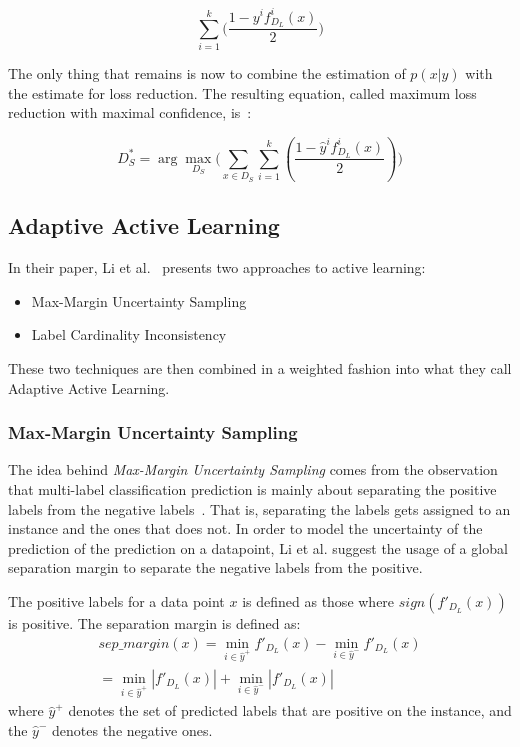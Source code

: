 \begin{equation}
    \sum_{i=1}^k\big ( \frac{1 - y^if^i_{D_L}(x)}{2} \big )
\end{equation}

The only thing that remains is now to combine the estimation of $p(x|y)$ with the estimate for loss reduction.
The resulting equation, called maximum loss reduction with maximal confidence, is~\cite{yang2009effective}:

\begin{equation}
    D^*_S = \arg \max_{D_S} \big ( \sum_{x \in D_S} \sum_{i=1}^k (\frac{1 - \hat{y}^if^i_{D_L}(x)}{2}) \big )
\end{equation}

\subsection{Adaptive Active Learning}\label{subsec:adaptive-active-learning}

In their paper, Li et al\@.~\cite{li2013active} presents two approaches to active learning:
\begin{itemize}
    \item Max-Margin Uncertainty Sampling
    \item Label Cardinality Inconsistency 
\end{itemize}
These two techniques are then combined in a weighted fashion into what they call Adaptive Active Learning.

\subsubsection{Max-Margin Uncertainty Sampling}

The idea behind \textit{Max-Margin Uncertainty Sampling} comes from the observation that multi-label classification prediction is mainly about separating the positive labels from the negative labels~\cite{li2013active}.
That is, separating the labels gets assigned to an instance and the ones that does not.
In order to model the uncertainty of the prediction of the prediction on a datapoint, Li et al\@. suggest the usage of a global separation margin to separate the negative labels from the positive.

The positive labels for a data point $x$ is defined as those where $sign(f'_{D_L}(x))$ is positive.
The separation margin is defined as:
\begin{equation}
    \begin{split}
        sep\_margin(x) = \min_{i \in \hat{y}^+}f'_{D_L}(x) - \min_{i \in \hat{y}^-}f'_{D_L}(x) \\
        = \min_{i \in \hat{y}^+}|f'_{D_L}(x)| + \min_{i \in \hat{y}^-}|f'_{D_L}(x)|
    \end{split}
\end{equation}
where $\hat{y}^+$ denotes the set of predicted labels that are positive on the instance, and the $\hat{y}^-$ denotes the negative ones.

